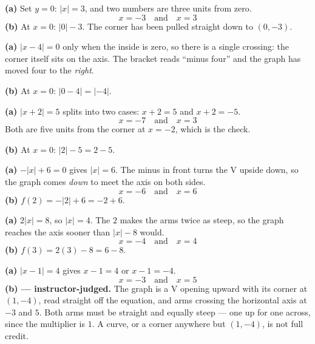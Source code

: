 \documentclass[12pt]{article}
\begin{document}




\textbf{(a)} Set $y = 0$: $|x| = 3$, and two numbers are three units from zero.
\[ \boxed{x = -3 \quad \text{and} \quad x = 3} \]
\textbf{(b)} At $x = 0$: $|0| - 3$. The corner has been pulled straight down to $(0,-3)$. 


\textbf{(a)} $|x-4| = 0$ only when the inside is zero, so there is a single crossing: the corner itself sits on the axis. The bracket reads ``minus four'' and the graph has moved four to the \emph{right}. 

\textbf{(b)} At $x = 0$: $|0-4| = |{-4}|$. 


\textbf{(a)} $|x+2| = 5$ splits into two cases: $x + 2 = 5$ and $x + 2 = -5$.
\[ \boxed{x = -7 \quad \text{and} \quad x = 3} \]
Both are five units from the corner at $x = -2$, which is the check.

\textbf{(b)} At $x = 0$: $|2| - 5 = 2 - 5$. 


\textbf{(a)} $-|x| + 6 = 0$ gives $|x| = 6$. The minus in front turns the V upside down, so the graph comes \emph{down} to meet the axis on both sides.
\[ \boxed{x = -6 \quad \text{and} \quad x = 6} \]
\textbf{(b)} $f(2) = -|2| + 6 = -2 + 6$. 


\textbf{(a)} $2|x| = 8$, so $|x| = 4$. The $2$ makes the arms twice as steep, so the graph reaches the axis sooner than $|x| - 8$ would.
\[ \boxed{x = -4 \quad \text{and} \quad x = 4} \]
\textbf{(b)} $f(3) = 2(3) - 8 = 6 - 8$. 


\textbf{(a)} $|x-1| = 4$ gives $x - 1 = 4$ or $x - 1 = -4$.
\[ \boxed{x = -3 \quad \text{and} \quad x = 5} \]
\textbf{(b) --- instructor-judged.} The graph is a V opening upward with its corner at $(1, -4)$, read straight off the equation, and arms crossing the horizontal axis at $-3$ and $5$. Both arms must be straight and equally steep --- one up for one across, since the multiplier is $1$. A curve, or a corner anywhere but $(1,-4)$, is not full credit.
\end{document}
